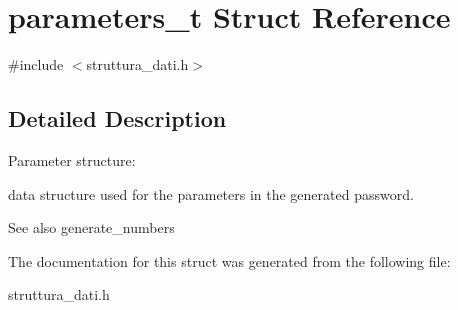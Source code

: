 \hypertarget{structparameters__t}{}\section{parameters\+\_\+t Struct Reference}
\label{structparameters__t}


{\ttfamily \#include $<$struttura\+\_\+dati.\+h$>$}



\subsection{Detailed Description}
Parameter structure\+:

data structure used for the parameters in the generated password. \begin{DoxySeeAlso}{See also}
generate\+\_\+numbers 
\end{DoxySeeAlso}


The documentation for this struct was generated from the following file\+:\begin{DoxyCompactItemize}
\item 
struttura\+\_\+dati.\+h\end{DoxyCompactItemize}
